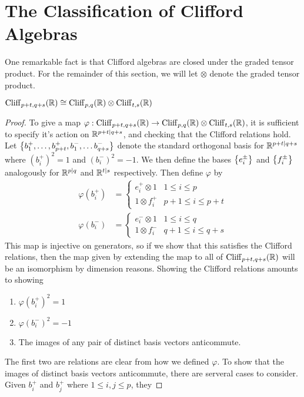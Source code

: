 \section{The Classification of Clifford Algebras}
%
One remarkable fact is that Clifford algebras are closed under the graded
tensor product. For the remainder of this section, we will let $\otimes$ denote
the graded tensor product.
%
\begin{thm}
$\operatorname{Cliff}_{p+t,q+s}(\mathbb{R}) \cong \operatorname{Cliff}_{p,q}(\mathbb{R}) \otimes \operatorname{Cliff}_{t,s}(\mathbb{R})$
\end{thm}
%
\begin{proof}
To give a map $\varphi : \operatorname{Cliff}_{p+t,q+s}(\mathbb{R}) \to \operatorname{Cliff}_{p,q}(\mathbb{R}) \otimes
\operatorname{Cliff}_{t,s}(\mathbb{R})$, it is sufficient to specify it's action on $\mathbb{R}^{p+t|q+s}$, and
checking that the Clifford relations hold. Let
$\left\lbrace b_1^+,\ldots, b_{p+t}^+, b_1^-, \ldots b_{q+s}^- \right\rbrace$ denote the standard
orthogonal basis for $\mathbb{R}^{p+t|q+s}$ where $(b_i^+)^2 = 1$ and $(b_i^-)^2 = -1$.
We then define the bases $\left\lbrace e_i^\pm \right\rbrace$ and $\left\lbrace f_i^\pm \right\rbrace$ analogously for
$\mathbb{R}^{p|q}$ and $\mathbb{R}^{t|s}$ respectively. Then define $\varphi$ by
%
\begin{align*}
\varphi(b_i^+) &= \begin{cases}
e_i^+ \otimes 1 & 1 \leq i \leq p \\
1 \otimes f_i^+ & p+1 \leq i \leq p+t
\end{cases} \\
\varphi(b_i^-) &= \begin{cases}
e_i^- \otimes 1 & 1 \leq i \leq q \\
1 \otimes f_i^- & q+1 \leq i \leq q+s
\end{cases}
\end{align*}
%
This map is injective on generators, so if we show that this satisfies the
Clifford relations, then the map given by extending the map to all of
$\operatorname{Cliff}_{p+t,q+s}(\mathbb{R})$ will be an isomorphism by dimension reasons. Showing
the Clifford relations amounts to showing
%
\begin{enumerate}
  \item $\varphi(b_i^+)^2 = 1$
  \item $\varphi(b_i^-)^2 = -1$
  \item The images of any pair of distinct basis vectors anticommute.
\end{enumerate}
%
The first two are relations are clear from how we defined $\varphi$. To show
that the images of distinct basis vectors anticommute, there are serveral
cases to consider. Given $b_i^+$ and $b_j^+$ where $1 \leq i,j \leq p$, they

\end{proof}

